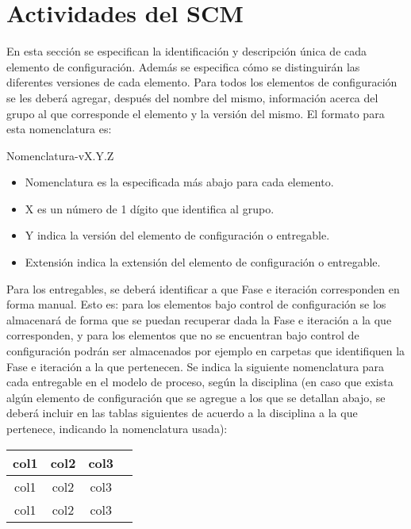 
\chapter{Actividades del SCM}
\label{intro}
En esta sección se especifican la identificación y descripción única de cada elemento de configuración.
Además se especifica cómo se distinguirán las diferentes versiones de cada elemento.
Para todos los elementos de configuración se les deberá agregar, después del nombre del mismo, información acerca del grupo al que corresponde el elemento y la versión del mismo.
El formato para esta nomenclatura es:


Nomenclatura-vX.Y.Z

\begin{itemize}
\item Nomenclatura es la especificada más abajo para cada elemento.
\item X es un número de 1 dígito que identifica al grupo.
\item Y indica la versión del elemento de configuración o entregable.
\item Extensión indica la extensión del elemento de configuración o entregable.
\end{itemize}


Para los entregables, se deberá identificar a que Fase e iteración corresponden en forma manual. Esto es: para los elementos bajo control de configuración se los almacenará de forma que se puedan recuperar dada la Fase e iteración a la que corresponden, y para los elementos que no se encuentran bajo control de configuración podrán ser almacenados por ejemplo en carpetas que identifiquen la Fase e iteración a la que pertenecen.
Se indica la siguiente nomenclatura para cada entregable en el modelo de proceso, según la disciplina (en caso que exista algún elemento de configuración que se agregue a los que se detallan abajo, se deberá incluir en las tablas siguientes de acuerdo a la disciplina a la que pertenece, indicando la nomenclatura usada):


\begin{center}
\begin{tabular}{ |c|c|c|c| } 
\hline
col1 & col2 & col3 \\
\hline
col1 & col2 & col3 \\
\hline
col1 & col2 & col3 \\
\hline
\end{tabular}
\end{center}




\cleardoublepage